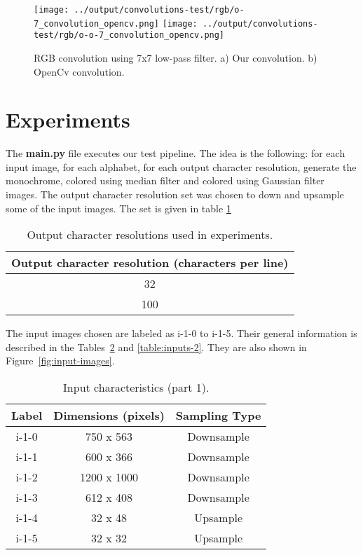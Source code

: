 \documentclass[]{IEEEtran}
\begin{document}
\begin{figure}[H]
    \centering
    \texttt{[image: ../output/convolutions-test/rgb/o-7\_convolution\_opencv.png]}
    \texttt{[image: ../output/convolutions-test/rgb/o-o-7\_convolution\_opencv.png]}
    \caption{RGB convolution using 7x7 low-pass filter. a) Our convolution. b) OpenCv convolution.}
    \label{fig:convolution-2}
\end{figure}

\section{Experiments}
The \textbf{main.py} file executes our test pipeline. The idea is the following: for each input image, for each alphabet, for each output character resolution, generate the monochrome, colored using median filter and colored using Gaussian filter images.
The output character resolution set was chosen to down and upsample some of the input images. The set is given in table \ref{table:resolutions}

\begin{table}[H]
\centering
\begin{center}
\begin{tabular}{ |c| } 
 \hline
 Output character resolution (characters per line)\\
 \hline
 32 \\ 
 \hline
 100  \\
 \hline
\end{tabular}
 \label{table:resolutions}
 \caption{Output character resolutions used in experiments.}
\end{center}
\end{table}

The input images chosen are labeled as i-1-0 to i-1-5. Their general information is described in the Tables~\ref{table:inputs-1} and \ref{table:inputs-2}. They are also shown in Figure~\ref{fig:input-images}.

\begin{table}[H]
\centering
\begin{tabular}{ |c|c|c| } 
 \hline
 Label & Dimensions (pixels) & Sampling Type\\
 \hline
 i-1-0 & 750 x 563 & Downsample\\  
 \hline
 i-1-1 & 600 x 366 & Downsample\\
 \hline
 i-1-2 & 1200 x 1000 & Downsample\\
 \hline
 i-1-3 & 612 x 408 & Downsample\\
 \hline
 i-1-4 & 32 x 48 & Upsample \\
 \hline
 i-1-5 & 32 x 32 & Upsample\\
 \hline
\end{tabular}
 \label{table:inputs-1}
 \caption{Input characteristics (part 1).}
\end{table}
\end{document}
